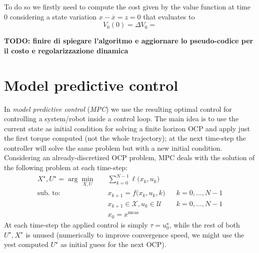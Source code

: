 	To do so we firstly need to compute the cost given by the value function at time $0$ considering a state variation $x - \overline x = z = 0$ that evaluates to
	\[ V_0(0) = \Delta V_0 = \]
	
	\textbf{TODO: finire di spiegare l'algoritmo e aggiornare lo pseudo-codice per il costo e regolarizzazione dinamica}
	
	
	
\section{Model predictive control}
	In \textit{model predictive control} (\textit{MPC}) we use the resulting optimal control for controlling a system/robot inside a control loop. The main idea is to use the current state as initial condition for solving a finite horizon OCP and apply just the first torque computed (not the whole trajectory); at the next time-step the controller will solve the same problem but with a new initial condition.\\
	Considering an already-discretized OCP problem, MPC deals with the solution of the following problem at each time-step:
	\begin{equation}
	\begin{aligned}
		X^\star,U^\star =  \arg \min_{X,U} \quad & \sum_{k=0}^{N-1} \ell \big(x_k, u_k\big) \\
		\textrm{sub. to:}\quad & x_{k+1} = f\big(x_k, u_k, k\big) && k = 0,\dots, N-1 \\
		&x_{k+1} \in \mathcal X, u_k \in \mathcal U && k = 0,\dots, N-1 \\
		& x_0 = x^\textrm{meas}
	\end{aligned}
	\end{equation}
	At each time-step the applied control is simply $\tau = u_0^\star$, while the rest of both $U^\star, X^\star$ is unused (numerically to improve convergence speed, we might use the yest computed $U^\star$ as initial guess for the next OCP).
	
